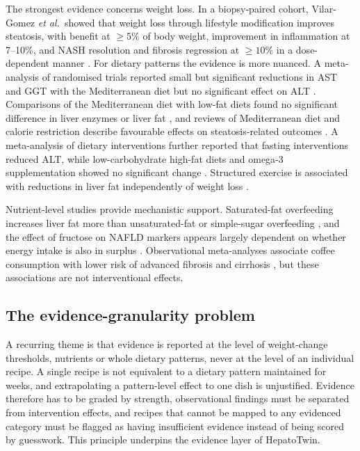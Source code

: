The strongest evidence concerns weight loss. In a biopsy-paired cohort, Vilar-Gomez \emph{et al.}\ showed that weight loss through lifestyle modification improves steatosis, with benefit at $\geq 5\%$ of body weight, improvement in inflammation at 7--10\%, and NASH resolution and fibrosis regression at $\geq 10\%$ in a dose-dependent manner \cite{vilargomez2015}. For dietary patterns the evidence is more nuanced. A meta-analysis of randomised trials reported small but significant reductions in AST and GGT with the Mediterranean diet but no significant effect on ALT \cite{sangouni2022}. Comparisons of the Mediterranean diet with low-fat diets found no significant difference in liver enzymes or liver fat \cite{xiong2024}, and reviews of Mediterranean diet and calorie restriction describe favourable effects on steatosis-related outcomes \cite{haigh2022}. A meta-analysis of dietary interventions further reported that fasting interventions reduced ALT, while low-carbohydrate high-fat diets and omega-3 supplementation showed no significant change \cite{stern2026}. Structured exercise is associated with reductions in liver fat independently of weight loss \cite{stine2023}.

Nutrient-level studies provide mechanistic support. Saturated-fat overfeeding increases liver fat more than unsaturated-fat or simple-sugar overfeeding \cite{luukkonen2018}, and the effect of fructose on NAFLD markers appears largely dependent on whether energy intake is also in surplus \cite{chiu2014}. Observational meta-analyses associate coffee consumption with lower risk of advanced fibrosis and cirrhosis \cite{liu2015,ebadi2021}, but these associations are not interventional effects.

\subsection{The evidence-granularity problem}

A recurring theme is that evidence is reported at the level of weight-change thresholds, nutrients or whole dietary patterns, never at the level of an individual recipe. A single recipe is not equivalent to a dietary pattern maintained for weeks, and extrapolating a pattern-level effect to one dish is unjustified. Evidence therefore has to be graded by strength, observational findings must be separated from intervention effects, and recipes that cannot be mapped to any evidenced category must be flagged as having insufficient evidence instead of being scored by guesswork. This principle underpins the evidence layer of HepatoTwin.

